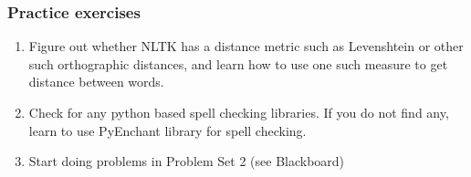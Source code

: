 \documentclass{beamer}
\begin{document}
\begin{frame}
\frametitle{Practice exercises}
\begin{enumerate}
\item Figure out whether NLTK has a distance metric such as Levenshtein or other such orthographic distances, and learn how to use one such measure to get distance between words.
\item Check for any python based spell checking libraries. If you do not find any, learn to use PyEnchant library for spell checking. \pause
\item Start doing problems in Problem Set 2 (see Blackboard)
\end{enumerate}
\end{frame}
\end{document}
